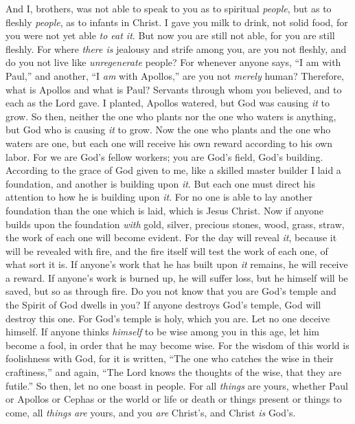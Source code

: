 \begin{biblechapter} %
 And I, brothers, was not able to speak to you as to spiritual \textit{people}, but as to fleshly \textit{people}, as to infants in Christ.
\verse I gave you milk to drink, not solid food, for you were not yet able \textit{to eat it}. But now you are still not able,
\verse for you are still fleshly. For where \textit{there is} jealousy and strife among you, are you not fleshly, and do you not live like \textit{unregenerate} people?
\verse For whenever anyone says, “I am with Paul,” and another, “I \textit{am} with Apollos,” are you not \textit{merely} human?
\verse Therefore, what is Apollos and what is Paul? Servants through whom you believed, and to each as the Lord gave.
\verse I planted, Apollos watered, but God was causing \textit{it} to grow.
\verse So then, neither the one who plants nor the one who waters is anything, but God who is causing \textit{it} to grow.
\verse Now the one who plants and the one who waters are one, but each one will receive his own reward according to his own labor.
\verse For we are God’s fellow workers; you are God’s field, God’s building.
\verse According to the grace of God given to me, like a skilled master builder I laid a foundation, and another is building upon \textit{it}. But each one must direct his attention to how he is building upon \textit{it}.
\verse For no one is able to lay another foundation than the one which is laid, which is Jesus Christ.
\verse Now if anyone builds upon the foundation \textit{with} gold, silver, precious stones, wood, grass, straw,
\verse the work of each one will become evident. For the day will reveal \textit{it}, because it will be revealed with fire, and the fire itself will test the work of each one, of what sort it is.
\verse If anyone’s work that he has built upon \textit{it} remains, he will receive a reward.
\verse If anyone’s work is burned up, he will suffer loss, but he himself will be saved, but so as through fire.
\verse Do you not know that you are God’s temple and the Spirit of God dwells in you?
\verse If anyone destroys God’s temple, God will destroy this one. For God’s temple is holy, which you are.
\verse Let no one deceive himself. If anyone thinks \textit{himself} to be wise among you in this age, let him become a fool, in order that he may become wise.
\verse For the wisdom of this world is foolishness with God, for it is written, “The one who catches the wise in their craftiness,”
\verse and again, “The Lord knows the thoughts of the wise, that they are futile.”
\verse So then, let no one boast in people. For all \textit{things} are yours,
\verse whether Paul or Apollos or Cephas or the world or life or death or things present or things to come, all \textit{things} \textit{are} yours,
\verse and you \textit{are} Christ’s, and Christ \textit{is} God’s.
\end{biblechapter}


